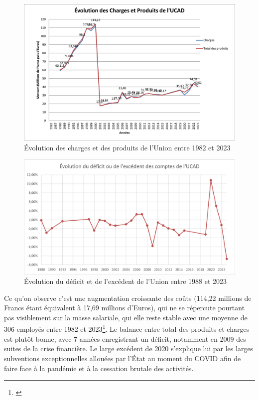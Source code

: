 \begin{figure}[H]
    \centering
    \includegraphics[width=0.75\linewidth]{Illustrations/Image1.png}
    \caption{Évolution des charges et des produits de l'Union entre 1982 et 2023}
    \label{fig:placeholder}
\end{figure}

\begin{figure}[H]
    \centering
    \includegraphics[width=0.75\linewidth]{Illustrations/Image5.png}
    \caption{Évolution du déficit et de l'excédent de l'Union entre 1988 et 2023}
    \label{fig:placeholder}
\end{figure}
\pagebreak

Ce qu'on observe c'est une augmentation croissante des coûts (114,22 millions de Francs étant équivalent à 17,69 millions d'Euros), qui ne se répercute pourtant pas visiblement sur la masse salariale, qui elle reste stable avec une moyenne de 306 employés entre 1982 et 2023\footnote{\cite{noauthor_convertisseur_nodate}}. Le balance entre total des produits et charges est plutôt bonne, avec 7 années enregistrant un déficit, notamment en 2009 des suites de la crise financière. Le large excédent de 2020 s'explique lui par les larges subventions exceptionnelles allouées par l'État au moment du COVID afin de faire face à la pandémie et à la cessation brutale des activités. 

